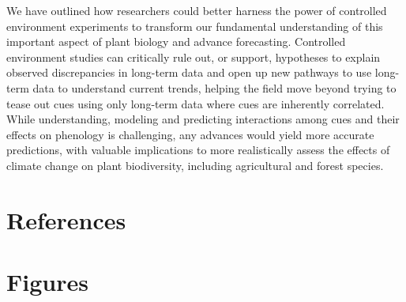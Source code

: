 \documentclass[11pt,letter]{article}
\begin{document}
We have outlined how researchers could better harness the power of controlled environment experiments to transform our fundamental understanding of this important aspect of plant biology and advance forecasting. Controlled environment studies can critically rule out, or support, hypotheses to explain observed discrepancies in long-term data and open up new pathways to use long-term data to understand current trends, helping the field move beyond trying to tease out cues using only long-term data where cues are inherently correlated. While understanding, modeling and predicting interactions among cues and their effects on phenology is challenging, any advances would yield more accurate predictions, with valuable implications to more realistically assess the effects of climate change on plant biodiversity, including agricultural and forest species. 


\section{References}



\section{Figures}
\end{document}

